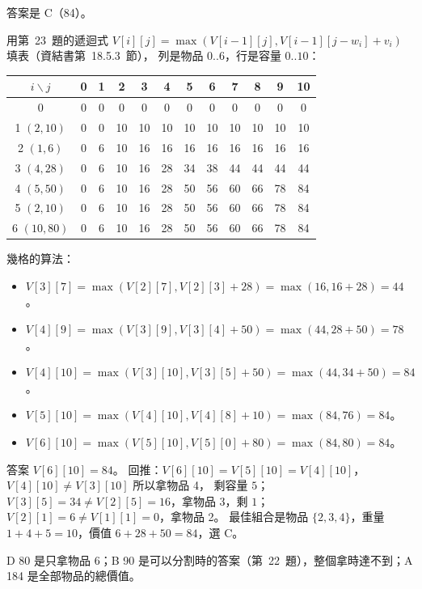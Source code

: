\begin{pastsoln}
答案是 C（84）。

用第~23~題的遞迴式 $V[i][j] = \max(V[i-1][j], V[i-1][j - w_i] + v_i)$ 填表（資結書第~18.5.3~節），
列是物品 $0..6$，行是容量 $0..10$：
\begin{center}
\small
\begin{tabular}{c|ccccccccccc}
\toprule
$i \backslash j$ & 0 & 1 & 2 & 3 & 4 & 5 & 6 & 7 & 8 & 9 & 10 \\
\midrule
0 & 0 & 0 & 0 & 0 & 0 & 0 & 0 & 0 & 0 & 0 & 0 \\
1 $(2, 10)$ & 0 & 0 & 10 & 10 & 10 & 10 & 10 & 10 & 10 & 10 & 10 \\
2 $(1, 6)$ & 0 & 6 & 10 & 16 & 16 & 16 & 16 & 16 & 16 & 16 & 16 \\
3 $(4, 28)$ & 0 & 6 & 10 & 16 & 28 & 34 & 38 & 44 & 44 & 44 & 44 \\
4 $(5, 50)$ & 0 & 6 & 10 & 16 & 28 & 50 & 56 & 60 & 66 & 78 & 84 \\
5 $(2, 10)$ & 0 & 6 & 10 & 16 & 28 & 50 & 56 & 60 & 66 & 78 & 84 \\
6 $(10, 80)$ & 0 & 6 & 10 & 16 & 28 & 50 & 56 & 60 & 66 & 78 & 84 \\
\bottomrule
\end{tabular}
\end{center}
幾格的算法：
\begin{itemize}
\item $V[3][7] = \max(V[2][7], V[2][3] + 28) = \max(16, 16 + 28) = 44$。
\item $V[4][9] = \max(V[3][9], V[3][4] + 50) = \max(44, 28 + 50) = 78$。
\item $V[4][10] = \max(V[3][10], V[3][5] + 50) = \max(44, 34 + 50) = 84$。
\item $V[5][10] = \max(V[4][10], V[4][8] + 10) = \max(84, 76) = 84$。
\item $V[6][10] = \max(V[5][10], V[5][0] + 80) = \max(84, 80) = 84$。
\end{itemize}
答案 $V[6][10] = 84$。 回推：$V[6][10] = V[5][10] = V[4][10]$，$V[4][10] \ne V[3][10]$ 所以拿物品 4，
剩容量 $5$；$V[3][5] = 34 \ne V[2][5] = 16$，拿物品 3，剩 $1$；$V[2][1] = 6 \ne V[1][1] = 0$，拿物品 2。
最佳組合是物品 $\{2, 3, 4\}$，重量 $1 + 4 + 5 = 10$，價值 $6 + 28 + 50 = 84$，選 C。

D 80 是只拿物品 6；B 90 是可以分割時的答案（第~22~題），整個拿時達不到；A 184 是全部物品的總價值。
\end{pastsoln}
